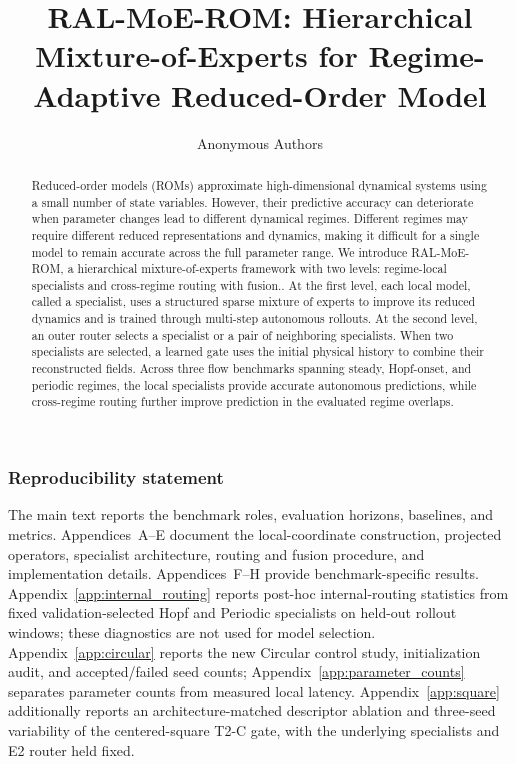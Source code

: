 \documentclass{article}
\title{RAL-MoE-ROM: Hierarchical Mixture-of-Experts for Regime-Adaptive Reduced-Order Model }
\author{Anonymous Authors}
\begin{document}
\raggedbottom

\maketitle

\begin{abstract}
Reduced-order models (ROMs) approximate high-dimensional dynamical systems using a small number of state variables. However, their predictive accuracy can deteriorate when parameter changes lead to different dynamical regimes. Different regimes may require different reduced representations and dynamics, making it difficult for a single model to remain accurate across the full parameter range. We introduce RAL-MoE-ROM, a hierarchical mixture-of-experts framework with two levels: regime-local specialists and cross-regime routing with fusion.. At the first level, each local model, called a specialist, uses a structured sparse mixture of experts to improve its reduced dynamics and is trained through multi-step autonomous rollouts. At the second level, an outer router selects a specialist or a pair of neighboring specialists. When two specialists are selected, a learned gate uses the initial physical history to combine their reconstructed fields. Across three flow benchmarks spanning steady, Hopf-onset, and periodic regimes, the local specialists provide accurate autonomous predictions, while cross-regime routing further improve prediction in the evaluated regime overlaps.
\end{abstract}





\FloatBarrier


\subsubsection*{Reproducibility statement}
The main text reports the benchmark roles, evaluation horizons, baselines, and metrics. Appendices~A--E document the local-coordinate construction, projected operators, specialist architecture, routing and fusion procedure, and implementation details. Appendices~F--H provide benchmark-specific results.
Appendix~\ref{app:internal_routing} reports post-hoc internal-routing statistics
from fixed validation-selected Hopf and Periodic specialists on held-out
rollout windows; these diagnostics are not used for model selection.
Appendix~\ref{app:circular} reports the new Circular control study, initialization audit, and accepted/failed seed counts; Appendix~\ref{app:parameter_counts} separates parameter counts from measured local latency.
Appendix~\ref{app:square} additionally reports an architecture-matched descriptor
ablation and three-seed variability of the centered-square T2-C gate, with the
underlying specialists and E2 router held fixed.
\end{document}
